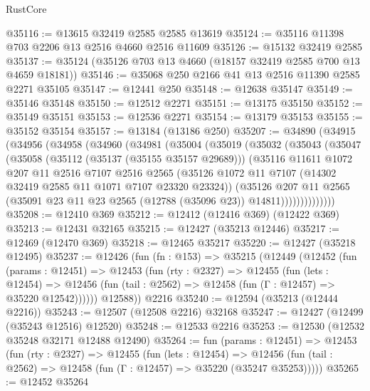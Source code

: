 \begin{lexlean}{RustCore}
\begin{coremodule}
@35116 := @13615 @32419 @2585 @2585 @13619
@35124 := @35116 @11398 @703 @2206 @13 @2516 @4660 @2516 @11609
@35126 := @15132 @32419 @2585
@35137 := @35124 (@35126 @703 @13 @4660 (@18157 @32419 @2585 @700 @13 @4659 @18181))
@35146 := @35068 @250 @2166 @41 @13 @2516 @11390 @2585 @2271 @35105
@35147 := @12441 @250
@35148 := @12638 @35147
@35149 := @35146 @35148
@35150 := @12512 @2271
@35151 := @13175 @35150
@35152 := @35149 @35151
@35153 := @12536 @2271
@35154 := @13179 @35153
@35155 := @35152 @35154
@35157 := @13184 (@13186 @250)
@35207 := @34890
    (@34915
      (@34956
        (@34958
          (@34960
            (@34981
              (@35004
                (@35019
                  (@35032
                    (@35043
                      (@35047
                        (@35058
                          (@35112 (@35137 (@35155 @35157 @29689)))
                          (@35116
                            @11611
                            @1072
                            @207
                            @11
                            @2516
                            @7107
                            @2516
                            @2565
                            (@35126
                              @1072
                              @11
                              @7107
                              (@14302 @32419 @2585 @11 @1071 @7107 @23320 @23324))
                            (@35126
                              @207
                              @11
                              @2565
                              (@35091 @23 @11 @23 @2565 (@12788 (@35096 @23)) @14811))))))))))))))
@35208 := @12410 @369
@35212 := @12412 (@12416 @369) (@12422 @369)
@35213 := @12431 @32165
@35215 := @12427 (@35213 @12446)
@35217 := @12469 (@12470 @369)
@35218 := @12465 @35217
@35220 := @12427 (@35218 @12495)
@35237 := @12426
    (fun (fn : @153) =>
    @35215
      (@12449
        (@12452
          (fun (params : @12451) =>
          @12453
            (fun (rty : @2327) =>
            @12455
              (fun (lets : @12454) =>
              @12456 (fun (tail : @2562) => @12458 (fun (Γ : @12457) => @35220 @12542))))))
        @12588))
    @2216
@35240 := @12594 (@35213 (@12444 @2216))
@35243 := @12507 (@12508 @2216) @32168
@35247 := @12427 (@12499 (@35243 @12516) @12520)
@35248 := @12533 @2216
@35253 := @12530 (@12532 @35248 @32171 @12488 @12490)
@35264 := fun (params : @12451) =>
  @12453
    (fun (rty : @2327) =>
    @12455
      (fun (lets : @12454) =>
      @12456 (fun (tail : @2562) => @12458 (fun (Γ : @12457) => @35220 (@35247 @35253)))))
@35265 := @12452 @35264

\end{coremodule}
\end{lexlean}
